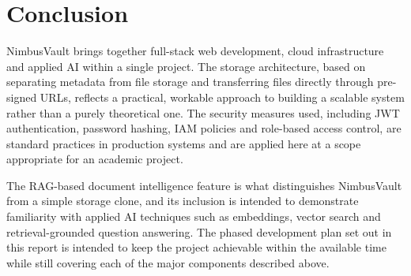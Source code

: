 \documentclass[11pt,a4paper,oneside]{report}
\begin{document}
\chapter{Conclusion}

NimbusVault brings together full-stack web development, cloud infrastructure and applied AI within a single project. The storage architecture, based on separating metadata from file storage and transferring files directly through pre-signed URLs, reflects a practical, workable approach to building a scalable system rather than a purely theoretical one. The security measures used, including JWT authentication, password hashing, IAM policies and role-based access control, are standard practices in production systems and are applied here at a scope appropriate for an academic project.

The RAG-based document intelligence feature is what distinguishes NimbusVault from a simple storage clone, and its inclusion is intended to demonstrate familiarity with applied AI techniques such as embeddings, vector search and retrieval-grounded question answering. The phased development plan set out in this report is intended to keep the project achievable within the available time while still covering each of the major components described above.
\end{document}
